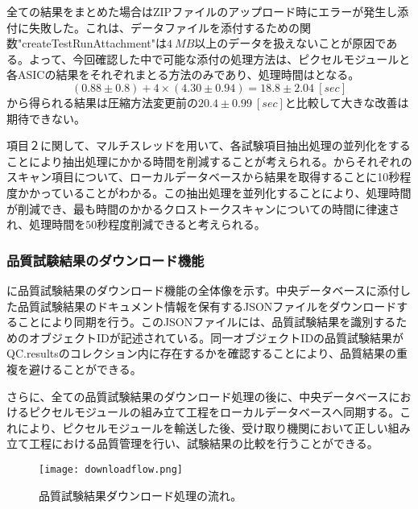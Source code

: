 全ての結果をまとめた場合はZIPファイルのアップロード時にエラーが発生し添付に失敗した。これは、データファイルを添付するための関数"createTestRunAttachment"は$4\ \si{MB}$以上のデータを扱えないことが原因である。よって、今回確認した中で可能な添付の処理方法は、ピクセルモジュールと各ASICの結果をそれぞれまとる方法のみであり、処理時間はとなる。
\begin{equation}
  \label{eq:asshuku}
  (0.88 \pm 0.8) + 4\times(4.30 \pm 0.94) = 18.8 \pm 2.04\ [\si{sec}]
\end{equation}
から得られる結果は圧縮方法変更前の$20.4 \pm 0.99\ [\si{sec}]$と比較して大きな改善は期待できない。

項目２に関して、マルチスレッドを用いて、各試験項目抽出処理の並列化をすることにより抽出処理にかかる時間を削減することが考えられる。からそれぞれのスキャン項目について、ローカルデータベースから結果を取得することに10秒程度かかっていることがわかる。この抽出処理を並列化することにより、処理時間が削減でき、最も時間のかかるクロストークスキャンについての時間に律速され、処理時間を$50$秒程度削減できると考えられる。


\subsubsection{品質試験結果のダウンロード機能}


に品質試験結果のダウンロード機能の全体像を示す。中央データベースに添付した品質試験結果のドキュメント情報を保有するJSONファイルをダウンロードすることにより同期を行う。このJSONファイルには、品質試験結果を識別するためのオブジェクトIDが記述されている。同一オブジェクトIDの品質試験結果がQC.resultsのコレクション内に存在するかを確認することにより、品質結果の重複を避けることができる。

さらに、全ての品質試験結果のダウンロード処理の後に、中央データベースにおけるピクセルモジュールの組み立て工程をローカルデータベースへ同期する。これにより、ピクセルモジュールを輸送した後、受け取り機関において正しい組み立て工程における品質管理を行い、試験結果の比較を行うことができる。

\begin{figure}[tbp]
  \centering
  \texttt{[image: downloadflow.png]}
  \caption[品質試験結果ダウンロード処理の流れ]{品質試験結果ダウンロード処理の流れ。}
  \label{fig:downloadresults}
\end{figure}



